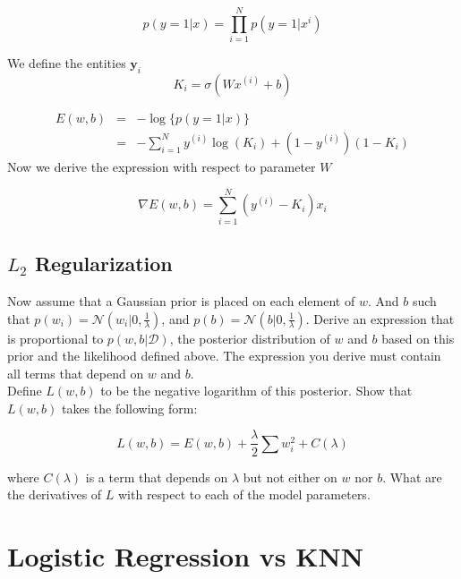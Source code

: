 \documentclass[a4paper]{tufte-handout}
\begin{document}
\begin{equation}
  p(y=1|x) = \prod_{i=1}^N p(y=1|x^{i})
\end{equation}


We define the entities $\mathbf{y}_i$
\begin{equation*}
  K_i = \sigma(Wx^{(i)} +b)
\end{equation*}

\begin{eqnarray}
  E(w,b) &=&  -\log\{p(y=1|x)\}\\
         &=& -\sum_{i=1}^N y^{(i)}\log(K_i) + (1-y^{(i)})(1-K_i) 
\end{eqnarray}
Now we derive the expression with respect to parameter $W$

\begin{equation}
  \nabla E(w,b) = \sum_{i=1}^N (y^{(i)} - K_i) x_i 
\end{equation}



\subsection{$L_2$ Regularization}%
\label{sub:_l_2_regularization}

Now assume that a Gaussian prior is placed on each element of $w$. And $b$ such
that $p(w_i) = \mathcal{N}(w_i|0, \frac{1}{\lambda})$, and $p(b)=
\mathcal{N}(b|0, \frac{1}{\lambda})$. Derive an expression that is proportional
to $p(w,b|\mathcal{D})$, the posterior distribution of $w$ and $b$ based on this
prior and the likelihood defined above. The expression you derive must contain
all terms that depend on $w$ and $b$.\\

Define $L(w,b) $ to be the negative logarithm of this posterior. Show that
$L(w,b)$ takes the following form:

\begin{equation}
  L(w,b) = E(w,b) + \frac{\lambda}{2} \sum w_i^2 +C(\lambda)
\end{equation}

where $C(\lambda)$ is a term that depends on $\lambda$ but not either on $w$ nor
$b$. What are the derivatives of $L$ with respect to each of the model
parameters.



\section{Logistic Regression vs KNN}%
\label{sec:logistic_regression_vs_knn}
\end{document}
